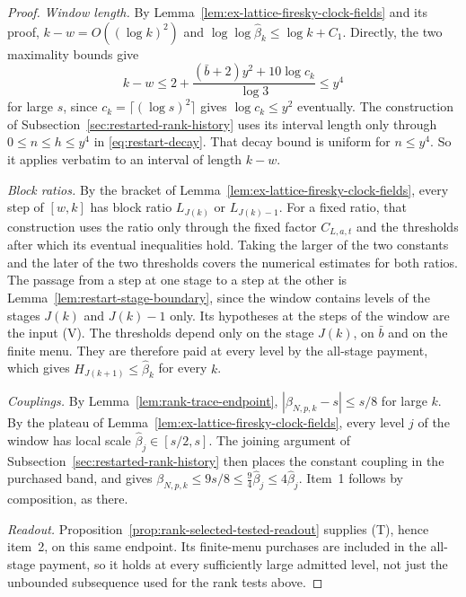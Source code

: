 \begin{proof}
\emph{Window length.} By
Lemma~\ref{lem:ex-lattice-firesky-clock-fields} and its proof,
$k-w=O((\log k)^2)$ and $\log\log\widehat\beta_k\le\log k+C_1$. Directly,
the two maximality bounds give
\[
 k-w\le2+\frac{(\bar b+2)y^2+10\log c_k}{\log3}\le y^4
\]
for large $s$, since $c_k=\lceil(\log s)^2\rceil$ gives
$\log c_k\le y^2$ eventually. The construction of
Subsection~\ref{sec:restarted-rank-history} uses its interval length only
through $0\le n\le h\le y^4$ in \eqref{eq:restart-decay}. That decay
bound is uniform for $n\le y^4$. So it applies verbatim to an interval
of length $k-w$.

\emph{Block ratios.} By the bracket of
Lemma~\ref{lem:ex-lattice-firesky-clock-fields}, every step of $[w,k]$
has block ratio $L_{J(k)}$ or $L_{J(k)-1}$. For a fixed ratio, that
construction uses the ratio only through the fixed factor $C_{L,a,t}$
and the thresholds after which its eventual inequalities hold. Taking
the larger of the two constants and the later of the two thresholds
covers the numerical estimates for both ratios. The passage from a step
at one stage to a step at the other is
Lemma~\ref{lem:restart-stage-boundary}, since the window contains levels
of the stages $J(k)$ and $J(k)-1$ only. Its hypotheses at the steps of
the window are the input (V). The
thresholds depend only on the stage $J(k)$, on $\bar b$ and on the
finite menu. They are therefore paid at every level by the all-stage
payment, which gives $H_{J(k+1)}\le\widehat\beta_k$ for every $k$.

\emph{Couplings.} By Lemma~\ref{lem:rank-trace-endpoint},
$|\beta_{N,p,k}-s|\le s/8$ for large $k$. By the plateau of
Lemma~\ref{lem:ex-lattice-firesky-clock-fields}, every level $j$ of the
window has local scale $\widehat\beta_j\in[s/2,s]$. The joining argument
of Subsection~\ref{sec:restarted-rank-history} then places the constant
coupling in the purchased band, and gives
$\beta_{N,p,k}\le9s/8\le\tfrac94\widehat\beta_j\le4\widehat\beta_j$.
Item~1 follows by composition, as there.

\emph{Readout.} Proposition~\ref{prop:rank-selected-tested-readout}
supplies (T), hence item~2, on this same endpoint. Its finite-menu
purchases are included in the all-stage payment, so it holds at every
sufficiently large admitted level, not just the unbounded subsequence
used for the rank tests above.
\end{proof}

